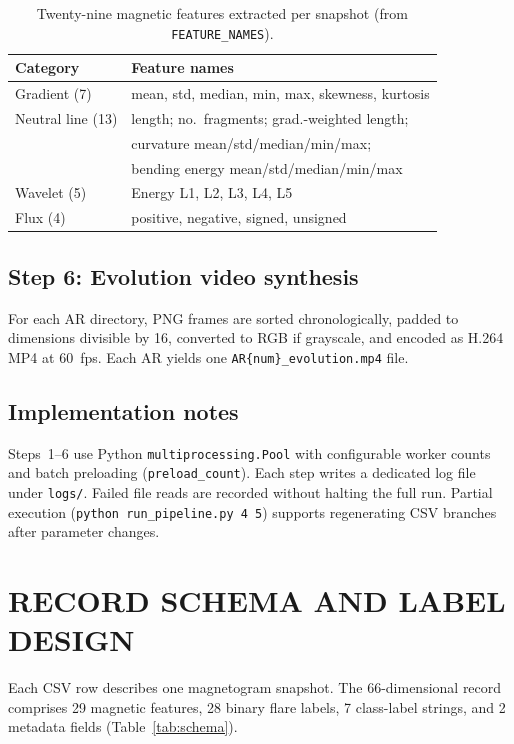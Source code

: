 \documentclass[]{spie}
\begin{document}
\begin{table}[t]
\caption{Twenty-nine magnetic features extracted per snapshot (from \texttt{FEATURE\_NAMES}).}
\label{tab:features}
\centering
\scriptsize
\begin{tabular}{@{}ll@{}}
\toprule
Category & Feature names \\
\midrule
Gradient (7) & mean, std, median, min, max, skewness, kurtosis \\
Neutral line (13) & length; no.\ fragments; grad.-weighted length; \\
& curvature mean/std/median/min/max; \\
& bending energy mean/std/median/min/max \\
Wavelet (5) & Energy L1, L2, L3, L4, L5 \\
Flux (4) & positive, negative, signed, unsigned \\
\bottomrule
\end{tabular}
\end{table}

\subsection{Step 6: Evolution video synthesis}

For each AR directory, PNG frames are sorted chronologically, padded to dimensions divisible by 16, converted to RGB if grayscale, and encoded as H.264 MP4 at 60~fps. Each AR yields one \texttt{AR\{num\}\_evolution.mp4} file.

\subsection{Implementation notes}

Steps~1--6 use Python \texttt{multiprocessing.Pool} with configurable worker counts and batch preloading (\texttt{preload\_count}). Each step writes a dedicated log file under \texttt{logs/}. Failed file reads are recorded without halting the full run. Partial execution (\texttt{python run\_pipeline.py 4 5}) supports regenerating CSV branches after parameter changes.

\section{RECORD SCHEMA AND LABEL DESIGN}
\label{sec:schema}

Each CSV row describes one magnetogram snapshot. The 66-dimensional record comprises 29 magnetic features, 28 binary flare labels, 7 class-label strings, and 2 metadata fields (Table~\ref{tab:schema}).
\end{document}
